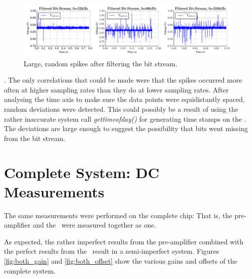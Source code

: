 \begin{figure}
    \centering
    \includegraphics[width=\linewidth]{images/plots/noisy_bitstream.pdf}
    \caption{Large, random spikes after filtering the bit stream.}
    \label{fig:noisy_sigdel}
\end{figure}
.
The only correlations that could  be  made  were that the
spikes  occurred  more  often  at  higher sampling rates than they do at lower
sampling rates. After analysing the time axis  to  make  sure  the data points
were  equidistantly  spaced,  random  deviations  were  detected.  This  could
possibly   be   a  result  of  using  the  rather   inaccurate   system   call
\textit{gettimeofday()}  for  generating  time  stamps  on  the   \raspi.  The
deviations are large enough to  suggest the possibility that bits went missing
from the bit stream.

\section{Complete System: DC Measurements}
\label{sec:systemDC}

The  same  measurements  were  performed  on  the complete chip: That is,  the
pre-amplifier and the \sdm~were measured together as one.

As expected, the rather imperfect results from the pre-amplifier combined with
the perfect results from the \sdm~result in a  semi-imperfect  system. Figures
\ref{fig:both_gain}  and  \ref{fig:both_offset}  show  the  various gains  and
offsets of the complete system.

